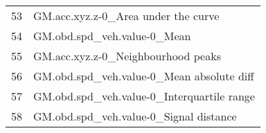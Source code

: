 \begin{tabular}{ll}
53 &               GM.acc.xyz.z-0\_Area under the curve \\
54 &                       GM.obd.spd\_veh.value-0\_Mean \\
55 &                GM.acc.xyz.z-0\_Neighbourhood peaks \\
56 &         GM.obd.spd\_veh.value-0\_Mean absolute diff \\
57 &        GM.obd.spd\_veh.value-0\_Interquartile range \\
58 &            GM.obd.spd\_veh.value-0\_Signal distance \\
\bottomrule
\end{tabular}

